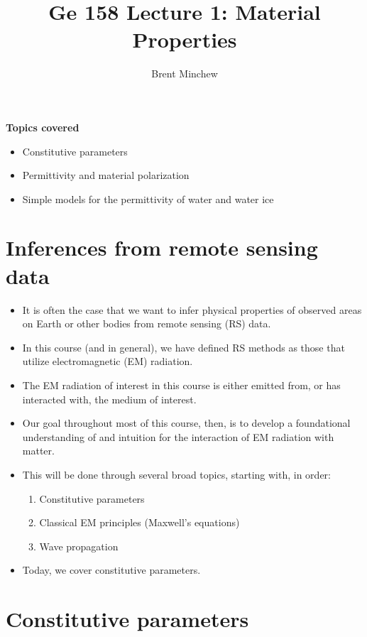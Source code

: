 \documentclass[11pt, oneside]{article}
\title{Ge 158 Lecture 1: Material Properties}
\author{Brent Minchew}
\date{}
\begin{document}
\maketitle

\noindent\textbf{Topics covered}
\begin{itemize}
	\item Constitutive parameters
	\item Permittivity and material polarization
	\item Simple models for the permittivity of water and water ice
\end{itemize}

\section{Inferences from remote sensing data}

\begin{itemize}
	\item It is often the case that we want to infer physical properties of observed areas on Earth or other bodies from remote sensing (RS) data.
	\item In this course (and in general), we have defined RS methods as those that utilize electromagnetic (EM) radiation.
	\item The EM radiation of interest in this course is either emitted from, or has interacted with, the medium of interest.
	\item Our goal throughout most of this course, then, is to develop a foundational understanding of and intuition for the interaction of EM radiation with matter.
	\item This will be done through several broad topics, starting with, in order:
	\begin{enumerate}
		\item Constitutive parameters
		\item Classical EM principles (Maxwell's equations)
		\item Wave propagation
	\end{enumerate}
	\item Today, we cover constitutive parameters.
\end{itemize}

\section{Constitutive parameters}
\end{document}
